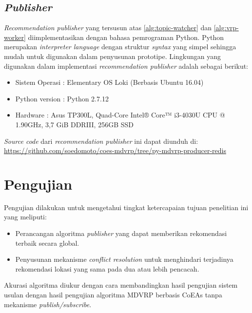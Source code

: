 \subsection{\textit{Publisher}}
\textit{Recommendation publisher} yang tersusun atas \autoref{alg:topic-watcher} dan \autoref{alg:vrp-worker} diimplementasikan dengan bahasa pemrograman Python. Python merupakan \textit{interpreter language} dengan struktur \textit{syntax} yang simpel sehingga mudah untuk digunakan dalam penyusunan prototipe. Lingkungan yang digunakan dalam implementasi \textit{recommendation publisher} adalah sebagai berikut:

\begin{itemize}
	\item Sistem Operasi		: Elementary OS Loki (Berbasis Ubuntu 16.04)
	\item Python version		: Python 2.7.12
	\item Hardware				: Asus TP300L, Quad-Core Intel® Core™ i3-4030U CPU @ 1.90GHz, 3,7 GiB DDRIII, 256GB SSD
\end{itemize}

\textit{Source code} dari \textit{recommendation publisher} ini dapat diunduh di: \url{https://github.com/soedomoto/coes-mdvrp/tree/py-mdvrp-producer-redis}

\section{Pengujian}
\label{sec:testing}
Pengujian dilakukan untuk mengetahui tingkat ketercapaian tujuan penelitian ini yang meliputi:
\begin{itemize}
	\item Perancangan algoritma \textit{publisher} yang dapat memberikan rekomendasi terbaik secara global.
	\item Penyusunan mekanisme \textit{conflict resolution} untuk menghindari terjadinya rekomendasi lokasi yang sama pada dua atau lebih pencacah.
\end{itemize}

Akurasi algoritma diukur dengan cara membandingkan hasil pengujian sistem usulan dengan hasil pengujian algoritma MDVRP berbasis CoEAs tanpa mekanisme \textit{publish/subscribe}.


